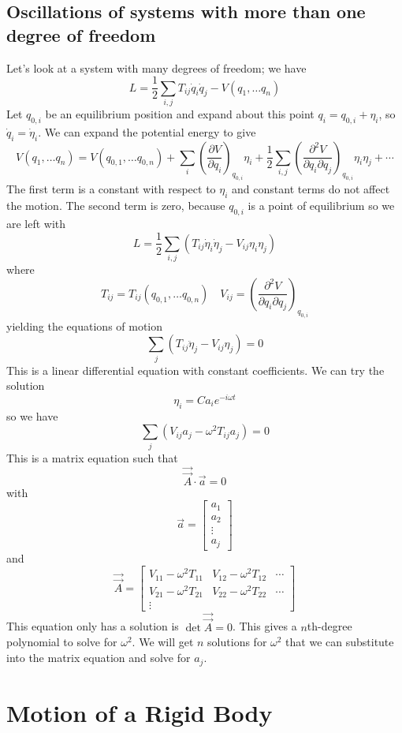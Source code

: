 \documentclass[cyan]{elegantnote}
\begin{document}
\section{Oscillations of systems with more than one degree of freedom}
Let's look at a system with many degrees of freedom; we have
\[L={\frac {1}{2}}\sum _{i,j}T_{ij}{\dot {q}}_{i}{\dot {q}}_{j}-V\left(q_{1},\ldots q_{n}\right)\]
Let $q_{0,i}$ be an equilibrium position and expand about this point $q_{i}=q_{0,i}+\eta _{i}$, so $\dot{q}_{i}=\dot {\eta }_{i}$.
We can expand the potential energy to give
\[V\left(q_{1},\ldots q_{n}\right)=V\left(q_{0,1},\ldots q_{0,n}\right)+\sum _{i}\left({\frac {\partial V}{\partial q_{i}}}\right)_{q_{0,i}}\eta _{i}+{\frac {1}{2}}\sum _{i,j}\left({\frac {\partial ^{2}V}{\partial q_{i}\partial q_{j}}}\right)_{q_{0,i}}\eta _{i}\eta _{j}+\cdots\]
The first term is a constant with respect to $\eta_i$ and constant terms do not affect the motion. The second term is zero, because $q_{0,i}$ is a point of equilibrium so we are left with
\[L={\frac {1}{2}}\sum _{i,j}\left(T_{ij}{\dot {\eta }}_{i}{\dot {\eta }}_{j}-V_{ij}\eta _{i}\eta _{j}\right)\]
where
\[T_{ij}=T_{ij}\left(q_{0,1},\ldots q_{0,n}\right) \quad V_{ij}=\left({\frac {\partial ^{2}V}{\partial q_{i}\partial q_{j}}}\right)_{q_{0,i}}\]
yielding the equations of motion
\[\sum _{j}\left(T_{ij}{\ddot {\eta }}_{j}-V_{ij}\eta _{j}\right)=0\]
This is a linear differential equation with constant coefficients. We can try the solution
\[\eta _{i}=Ca_{i}e^{-i\omega t}\]
so we have
\[\sum _{j}\left(V_{ij}a_{j}-\omega ^{2}T_{ij}a_{j}\right)=0\]
This is a matrix equation such that
\[{\vec {\vec {A}}}\cdot {\vec {a}}=0\]
with
\[{\vec {a}}=\left[{\begin{matrix}a_{1}\\a_{2}\\\vdots \\a_{j}\end{matrix}}\right]\]
and
\[{\vec {\vec {A}}}=\left[{\begin{matrix}V_{11}-\omega ^{2}T_{11}&V_{12}-\omega ^{2}T_{12}&\cdots \\V_{21}-\omega ^{2}T_{21}&V_{22}-\omega ^{2}T_{22}&\cdots \\\vdots &&\end{matrix}}\right]\]
This equation only has a solution is $\det {\vec {\vec {A}}}=0$. This gives a $n$th-degree polynomial to solve for $\omega^2$. We will get $n$ solutions for $\omega^2$ that we can substitute into the matrix equation and solve for $a_j$.

\chapter{Motion of a Rigid Body}
\end{document}
